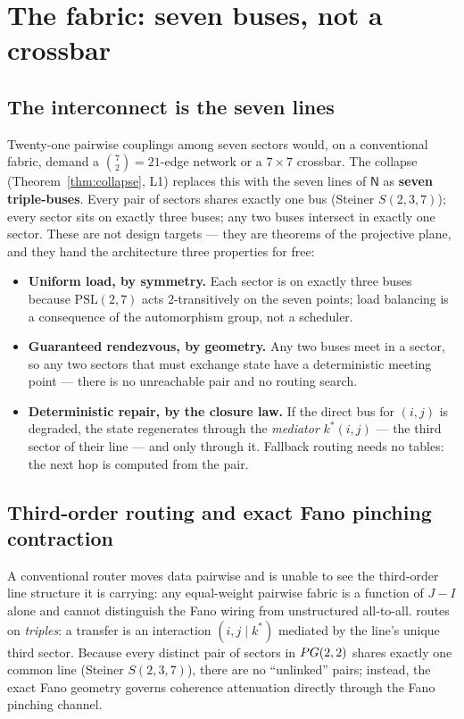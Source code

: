 \section{The fabric: seven buses, not a crossbar}
\label{sec:fabric}

\subsection{The interconnect is the seven lines}

Twenty-one pairwise couplings among seven sectors would, on a conventional
fabric, demand a $\binom{7}{2}=21$-edge network or a $7\times7$ crossbar. The
collapse (Theorem~\ref{thm:collapse}, L1) replaces this with the seven lines
of $\mathsf{N}$ as \textbf{seven triple-buses}. Every pair of sectors shares
exactly one bus (Steiner $S(2,3,7)$); every sector sits on exactly three
buses; any two buses intersect in exactly one sector. These are not design
targets --- they are theorems of the projective plane, and they hand the
architecture three properties for free:

\begin{itemize}[leftmargin=1.5em,itemsep=1pt]
  \item \textbf{Uniform load, by symmetry.} Each sector is on exactly three
        buses because $\mathrm{PSL}(2,7)$ acts $2$-transitively on the seven
        points; load balancing is a consequence of the automorphism group,
        not a scheduler.
  \item \textbf{Guaranteed rendezvous, by geometry.} Any two buses meet in a
        sector, so any two sectors that must exchange state have a
        deterministic meeting point --- there is no unreachable pair and no
        routing search.
  \item \textbf{Deterministic repair, by the closure law.} If the direct bus
        for $(i,j)$ is degraded, the state regenerates through the
        \emph{mediator} $k^\ast(i,j)$ --- the third sector of their line ---
        and only through it. Fallback routing needs no tables: the next hop
        is computed from the pair.
\end{itemize}

\subsection{Third-order routing and exact Fano pinching contraction}

A conventional router moves data pairwise and is unable to see the third-order
line structure it is carrying: any equal-weight pairwise fabric is a function of
$J-I$ alone and cannot distinguish the Fano wiring from unstructured all-to-all.
\TALOS{} routes on \emph{triples}: a transfer is an interaction
$(i,j\mid k^\ast)$ mediated by the line's unique third sector. Because every
distinct pair of sectors in $PG(2,2)$ shares exactly one common line (Steiner
$S(2,3,7)$), there are no ``unlinked'' pairs; instead, the exact Fano geometry
governs coherence attenuation directly through the Fano pinching channel.

